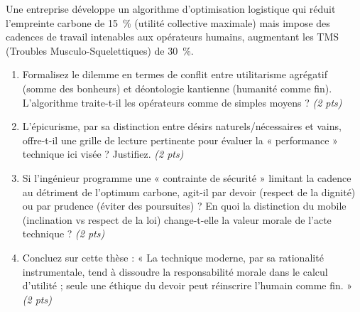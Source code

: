 \documentclass[11pt]{article}
\begin{document}
\begin{exercice}
Une entreprise développe un algorithme d'optimisation logistique qui réduit l'empreinte carbone de \SI{15}{\percent} (utilité collective maximale) mais impose des cadences de travail intenables aux opérateurs humains, augmentant les TMS (Troubles Musculo-Squelettiques) de \SI{30}{\percent}.
\begin{enumerate}
    \item Formalisez le dilemme en termes de conflit entre utilitarisme agrégatif (somme des bonheurs) et déontologie kantienne (humanité comme fin). L'algorithme traite-t-il les opérateurs comme de simples moyens ? \textit{(2 pts)}
    \item L'épicurisme, par sa distinction entre désirs naturels/nécessaires et vains, offre-t-il une grille de lecture pertinente pour évaluer la « performance » technique ici visée ? Justifiez. \textit{(2 pts)}
    \item Si l'ingénieur programme une « contrainte de sécurité » limitant la cadence au détriment de l'optimum carbone, agit-il par devoir (respect de la dignité) ou par prudence (éviter des poursuites) ? En quoi la distinction du mobile (inclination vs respect de la loi) change-t-elle la valeur morale de l'acte technique ? \textit{(2 pts)}
    \item Concluez sur cette thèse : « La technique moderne, par sa rationalité instrumentale, tend à dissoudre la responsabilité morale dans le calcul d'utilité ; seule une éthique du devoir peut réinscrire l'humain comme fin. » \textit{(2 pts)}
\end{enumerate}
\end{exercice}
\end{document}
